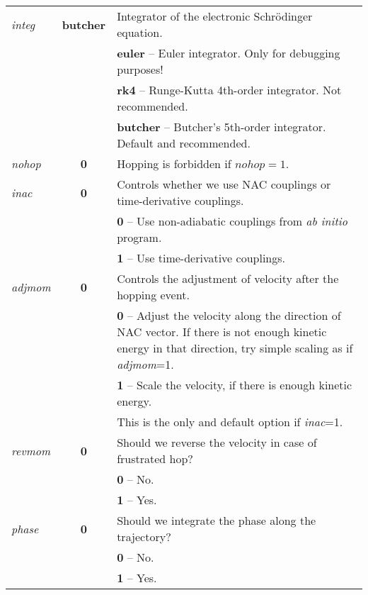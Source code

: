 \documentclass[12pt,a4paper]{article}
\begin{document}
\begin{tabular}{lcp{12cm}}
\colorbox{black!20}{\textit{integ}} & \textbf{butcher} & Integrator of the electronic Schr\"{o}dinger equation. \\
& & \textbf{euler} -- Euler integrator. Only for debugging purposes!\\
& & \textbf{rk4} -- Runge-Kutta 4th-order integrator. Not recommended.\\
& & \textbf{butcher} -- Butcher's 5th-order integrator. Default and recommended.\\

\colorbox{black!20}{\textit{nohop}} & \textbf{0} & Hopping is forbidden if $nohop=1$. \\

\colorbox{black!20}{\textit{inac}} & \textbf{0} & Controls whether we use NAC couplings or time-derivative couplings. \\
 & & \textbf{0} -- Use non-adiabatic couplings from \textit{ab initio} program. \\
 & & \textbf{1} -- Use time-derivative couplings. \\
 
\colorbox{black!20}{\textit{adjmom}} & \textbf{0} & Controls the adjustment of velocity after the hopping event. \\
 & & \textbf{0} -- Adjust the velocity along the direction of NAC vector.
 If there is not enough kinetic energy in that direction,
 try simple scaling as if \textit{adjmom}=1. \\
 & & \textbf{1} -- Scale the velocity, if there is enough kinetic energy. \\
 & & This is the only and default option if \textit{inac}=1.  \\
 
 \colorbox{black!20}{\textit{revmom}} & \textbf{0} & Should we reverse the velocity in case of frustrated hop? \\
 & & \textbf{0} -- No. \\
 & & \textbf{1} -- Yes. \\
 
 \colorbox{black!20}{\textit{phase}} & \textbf{0} & Should we integrate the phase along the trajectory? \\
 & & \textbf{0} -- No. \\
 & & \textbf{1} -- Yes. \\
 
\end{tabular}
\end{document}
